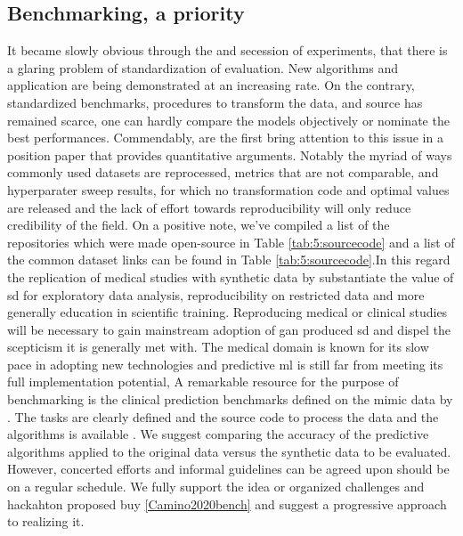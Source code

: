 \subsection{Benchmarking, a priority}
It became slowly obvious through the and secession of experiments, that there is a glaring problem of standardization of evaluation. New algorithms and application are being demonstrated at an increasing rate. On the contrary, standardized benchmarks, procedures to transform the data, and source has remained scarce, one can hardly compare the models objectively or nominate the best performances. Commendably, \citeauthor{Camino2020bench} are the first bring attention to this issue in a position paper that provides quantitative arguments. Notably the myriad of ways commonly used datasets are reprocessed, metrics that are not comparable, and hyperparater sweep results, for which no transformation code and optimal values are released and the lack of effort towards reproducibility will only reduce credibility of the field. On a positive note, we've compiled a list of the repositories which were made open-source in Table \ref{tab:5:sourcecode} and a list of the common dataset links can be found in Table \ref{tab:5:sourcecode}.In this regard the replication of medical studies with synthetic data by \citeauthor{Yale_2020} substantiate the value of \gls{sd} for exploratory data analysis, reproducibility on restricted data and more generally education in scientific training. Reproducing medical or clinical studies will be necessary to gain mainstream adoption of \gls{gan} produced \gls{sd} and dispel the scepticism it is generally met with. The medical domain is known for its slow pace in adopting new technologies and predictive \gls{ml} is still far from meeting its full implementation potential, A remarkable resource for the purpose of benchmarking is the clinical prediction benchmarks defined on the \gls{mimic} data by \citeauthor{harutyunyan_multitask_2019}. The tasks are clearly defined and the source code to process the data and the algorithms is available \cite{harutyunyan_multitask_2019}. We suggest comparing the accuracy of the predictive algorithms applied to the original data versus the synthetic data to be evaluated. However, concerted efforts and informal guidelines can be agreed upon should be on a regular schedule. We fully support the idea or organized challenges and hackahton proposed buy \ref{Camino2020bench} and suggest a progressive approach to realizing it.\\

